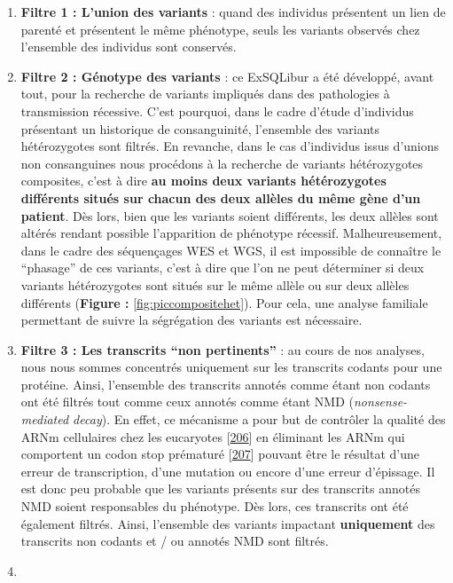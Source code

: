\documentclass[12pt,a4paper,twoside]{ugathesis}
\theoremstyle{definition}
\theoremstyle{definition}
\theoremstyle{definition}
\theoremstyle{remark}
\begin{document}
\begin{enumerate}
\def\labelenumi{\arabic{enumi}.}
\item
  \textbf{Filtre 1 : L'union des variants} : quand des individus
  présentent un lien de parenté et présentent le même phénotype, seuls
  les variants observés chez l'ensemble des individus sont conservés.
\item
  \textbf{Filtre 2 : Génotype des variants} : ce ExSQLibur a été
  développé, avant tout, pour la recherche de variants impliqués dans
  des pathologies à transmission récessive. C'est pourquoi, dans le
  cadre d'étude d'individus présentant un historique de consanguinité,
  l'ensemble des variants hétérozygotes sont filtrés. En revanche, dans
  le cas d'individus issus d'unions non consanguines nous procédons à la
  recherche de variants hétérozygotes composites, c'est à dire
  \textbf{au moins deux variants hétérozygotes différents situés sur
  chacun des deux allèles du même gène d'un patient}. Dès lors, bien que
  les variants soient différents, les deux allèles sont altérés rendant
  possible l'apparition de phénotype récessif. Malheureusement, dans le
  cadre des séquençages WES et WGS, il est impossible de connaître le
  ``phasage'' de ces variants, c'est à dire que l'on ne peut déterminer
  si deux variants hétérozygotes sont situés sur le même allèle ou sur
  deux allèles différents (\textbf{Figure : }\ref{fig:piccompositehet}).
  Pour cela, une analyse familiale permettant de suivre la ségrégation
  des variants est nécessaire.
\item
  \textbf{Filtre 3 : Les transcrits ``non pertinents''} : au cours de
  nos analyses, nous nous sommes concentrés uniquement sur les
  transcrits codants pour une protéine. Ainsi, l'ensemble des transcrits
  annotés comme étant non codants ont été filtrés tout comme ceux
  annotés comme étant NMD (\emph{nonsense-mediated decay}). En effet, ce
  mécanisme a pour but de contrôler la qualité des ARNm cellulaires chez
  les eucaryotes {[}\protect\hyperlink{ref-Chang2007}{206}{]} en
  éliminant les ARNm qui comportent un codon stop prématuré
  {[}\protect\hyperlink{ref-Baker2004}{207}{]} pouvant être le résultat
  d'une erreur de transcription, d'une mutation ou encore d'une erreur
  d'épissage. Il est donc peu probable que les variants présents sur des
  transcrits annotés NMD soient responsables du phénotype. Dès lors, ces
  transcrits ont été également filtrés. Ainsi, l'ensemble des variants
  impactant \textbf{uniquement} des transcrits non codants et / ou
  annotés NMD sont filtrés.
\item

\end{enumerate}
\end{document}
